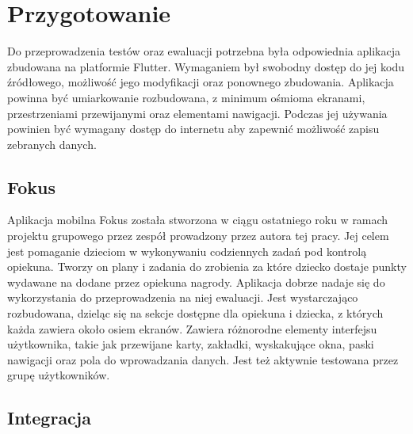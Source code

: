 \section{Przygotowanie}
Do przeprowadzenia testów oraz ewaluacji potrzebna była odpowiednia aplikacja zbudowana na platformie Flutter. Wymaganiem był swobodny dostęp do jej kodu źródłowego, możliwość jego modyfikacji oraz ponownego zbudowania. Aplikacja powinna być umiarkowanie rozbudowana, z minimum ośmioma ekranami, przestrzeniami przewijanymi oraz elementami nawigacji. Podczas jej używania powinien być wymagany dostęp do internetu aby zapewnić możliwość zapisu zebranych danych. 

\subsection{Fokus}
Aplikacja mobilna Fokus została stworzona w ciągu ostatniego roku w ramach projektu grupowego przez zespół prowadzony przez autora tej pracy. Jej celem jest pomaganie dzieciom w wykonywaniu codziennych zadań pod kontrolą opiekuna. Tworzy on plany i zadania do zrobienia za które dziecko dostaje punkty wydawane na dodane przez opiekuna nagrody. Aplikacja dobrze nadaje się do wykorzystania do przeprowadzenia na niej ewaluacji. Jest wystarczająco rozbudowana, dzieląc się na sekcje dostępne dla opiekuna i dziecka, z których każda zawiera około osiem ekranów. Zawiera różnorodne elementy interfejsu użytkownika, takie jak przewijane karty, zakładki, wyskakujące okna, paski nawigacji oraz pola do wprowadzania danych. Jest też aktywnie testowana przez grupę użytkowników.

\subsection{Integracja}

